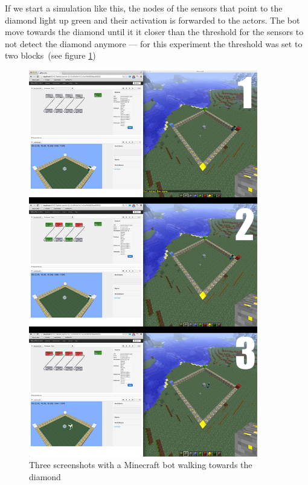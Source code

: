 If we start a simulation like this, the nodes of the sensors that point to the diamond light up green and their activation is forwarded to the actors. The bot move towards the diamond until it it closer than the threshold for the sensors to not detect the diamond anymore --- for this experiment the threshold was set to two blocks~(see figure \ref{diamond_screens})

\begin{figure}[h]
  \centering
    \includegraphics[width=10cm]{graphics/diamond_screens}
  \caption{Three screenshots with a Minecraft bot walking towards the diamond}
  \label{diamond_screens}
\end{figure}